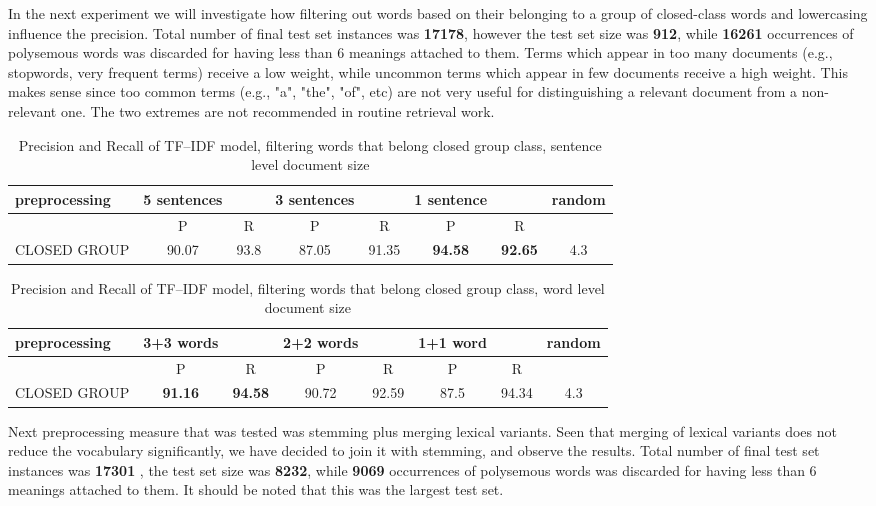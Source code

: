 In the next experiment we 
will investigate how filtering out words based on their belonging to a group of closed-class words and 
lowercasing influence the precision. Total number of final test set instances was  \textbf{17178}, however the test set size was  \textbf{912}, while \textbf{16261} occurrences of polysemous words was discarded  for having less than 6 meanings attached to them. 
Terms which appear in too many documents (e.g., stopwords, very 
frequent terms) receive a low weight, while uncommon terms which appear in few documents receive a 
high weight. This makes sense since too common terms (e.g., "a", "the", "of", etc) are not very useful for 
distinguishing a relevant document from a non-relevant one. The two extremes are not recommended in routine retrieval work. 

\begin{table}[h!]
\begin{tabular}{ l | c c | c c | c c | c}
   preprocessing &  5 sentences && 3 sentences && 1 sentence  && random\\
\hline
	& P  &  R & P  &  R & P  &  R &\\
\hline\hline
CLOSED GROUP & 90.07 & 93.8  & 87.05  & 91.35  & \textbf{94.58}  & \textbf{92.65}  & 4.3  \\
\end{tabular}
\caption{Precision and Recall of TF--IDF model, filtering words that belong closed group class, sentence level document size}
\end{table}

\begin{table}[h!]
\begin{tabular}{ l | c c | c c | c c | c}
   preprocessing &  3+3 words && 2+2 words && 1+1 word  && random\\
\hline\hline
	& P  &  R & P  &  R & P  &  R &\\
\hline
CLOSED GROUP & \textbf{91.16}  & \textbf{94.58} & 90.72 & 92.59 & 87.5  & 94.34  & 4.3  \\
\end{tabular}
\caption{Precision and Recall of TF--IDF model, filtering words that belong closed group class, word level document size}
\end{table}

Next preprocessing measure that was tested was stemming plus merging lexical variants. Seen that
merging of lexical variants does not reduce the vocabulary significantly, we have decided to join it
with stemming, and observe the results. Total number of final test set instances was  \textbf{17301} , the test set size was \textbf{8232}, while \textbf{9069} occurrences of polysemous words was discarded for having less than 6 meanings attached to them. It should be noted that this was the largest test set.

